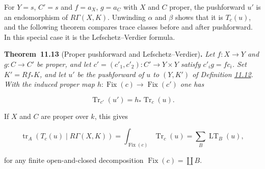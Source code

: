 \documentclass[11pt]{article}
\newenvironment{bpstatement}[2]{\par\addvspace{0.6\baselineskip}\noindent\textbf{#1}#2\textbf{.}\enspace\ignorespaces}
  {\par\addvspace{0.4\baselineskip}}
\newenvironment{bpstatementit}[2]{\begin{bpstatement}{#1}{#2}\itshape\ignorespaces}{\end{bpstatement}}
\providecommand{\Fix}{}\renewcommand{\Fix}{\operatorname{Fix}}
\begin{document}
\label{bp36}%
For \(Y=s\), \(C'=s\) and \(f=a_X\), \(g=a_C\) with \(X\) and \(C\) proper, the pushforward \(u'\) is an endomorphism of \(R\Gamma(X,K)\). Unwinding \(\alpha\) and \(\beta\) shows that it is \(T_c(u)\), and the following theorem compares trace classes before and after pushforward. In this special case it is the Lefschetz–Verdier formula.

\label{bp37}%
\begin{bpstatementit}{Theorem~11.13}{ (Proper pushforward and Lefschetz–Verdier)}
Let \(f:X\to Y\) and \(g:C\to C'\) be proper, and let \(c'=(c'_1,c'_2):C'\to Y\times Y\) satisfy \(c'_ig=fc_i\). Set \(K'=Rf_*K\), and let \(u'\) be the pushforward of \(u\) to \((Y,K')\) of Definition \hyperref[bp35]{11.12}. With the induced proper map \(h:\Fix(c)\to \Fix(c')\) one has

\[
\operatorname{Tr}_{c'}(u')=h_*\operatorname{Tr}_c(u).
\]

If \(X\) and \(C\) are proper over \(k\), this gives

\[
\operatorname{tr}_A(T_c(u)\mid R\Gamma(X,K))
=\int_{\Fix(c)}\operatorname{Tr}_c(u)
=\sum_B\operatorname{LT}_B(u),
\]

for any finite open-and-closed decomposition \(\Fix(c)=\coprod B\).
\end{bpstatementit}
\end{document}
